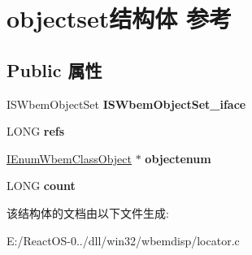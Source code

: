 \hypertarget{structobjectset}{}\section{objectset结构体 参考}
\label{structobjectset}
\subsection*{Public 属性}
\begin{DoxyCompactItemize}
\item 
\mbox{\label{structobjectset_a19b35bc64fe784bc03410aba62e96f21}} 
I\+S\+Wbem\+Object\+Set {\bfseries I\+S\+Wbem\+Object\+Set\+\_\+iface}
\item 
\mbox{\label{structobjectset_a5d818c4ec436a8e287bee8e47bebd570}} 
L\+O\+NG {\bfseries refs}
\item 
\mbox{\label{structobjectset_a9aa4f82caf89c8cb14ce11569c770393}} 
\hyperlink{interface_i_enum_wbem_class_object}{I\+Enum\+Wbem\+Class\+Object} $\ast$ {\bfseries objectenum}
\item 
\mbox{\label{structobjectset_aa54cb46b63d6a71eefbf81e54a28a9bc}} 
L\+O\+NG {\bfseries count}
\end{DoxyCompactItemize}


该结构体的文档由以下文件生成\+:\begin{DoxyCompactItemize}
\item 
E\+:/\+React\+O\+S-\/0../dll/win32/wbemdisp/locator.\+c\end{DoxyCompactItemize}

